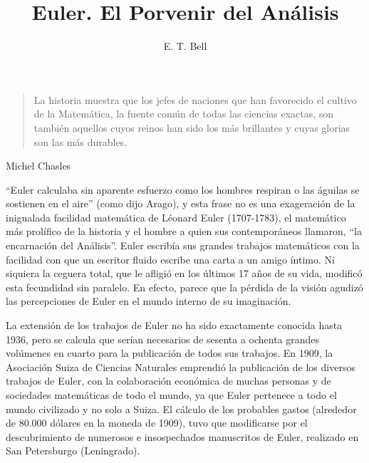 \documentclass[a4paper, 12pt]{article}
\title{Euler. El Porvenir del Análisis}
\author{E. T. Bell}
\date{}
\begin{document}
\begin{tcolorbox}[colback=blue!5!white,colframe=blue!75!black]

\vspace{-1.8cm}
\textbf \maketitle

\end{tcolorbox}

\bigskip





\begin{quote}\it

	La historia muestra que los jefes de naciones que han favorecido el cultivo de la Matemática, la fuente común de todas las ciencias exactas, son también aquellos cuyos reinos han sido los más brillantes y cuyas glorias son las más durables.

\end{quote}

\hfill Michel Chasles


\bigskip

``Euler calculaba sin aparente esfuerzo como los hombres respiran o las águilas se sostienen en el aire'' (como dijo Arago), y esta frase no es una exageración de la inigualada facilidad matemática de Léonard Euler (1707-1783), el matemático más prolífico de la historia y el hombre a quien sus contemporáneos llamaron, ``la encarnación del Análisis''. Euler escribía sus grandes trabajos matemáticos con la facilidad con que un escritor fluido escribe una carta a un amigo íntimo. Ni siquiera la ceguera total, que le afligió en los últimos 17 años de su vida, modificó esta fecundidad sin paralelo. En efecto, parece que la pérdida de la visión agudizó las percepciones de Euler en el mundo interno de su imaginación.

La extensión de los trabajos de Euler no ha sido exactamente conocida hasta 1936, pero se calcula que serían necesarios de sesenta a ochenta grandes volúmenes en cuarto para la publicación de todos sus trabajos. En 1909, la Asociación Suiza de Ciencias Naturales emprendió la publicación de los diversos trabajos de Euler, con la colaboración económica de muchas personas y de sociedades matemáticas de todo el mundo, ya que Euler pertenece a todo el mundo civilizado y no solo a Suiza. El cálculo de los probables gastos (alrededor de 80.000 dólares en la moneda de 1909), tuvo que modificarse por el descubrimiento de numerosos e insospechados manuscritos de Euler, realizado en San Petersburgo (Leningrado).
\end{document}
